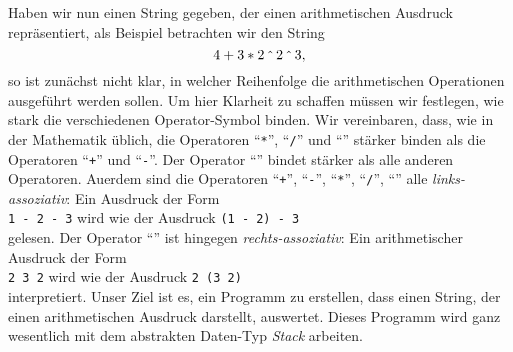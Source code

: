 Haben wir nun einen String gegeben, der einen arithmetischen Ausdruck repr\"asentiert, als
Beispiel betrachten wir den String
\[ 4 + 3 * 2 \mathop{\mathtt{\symbol{94}}} 2 \mathop{\mathtt{\symbol{94}}} 3, \]
so ist zun\"achst nicht klar, in welcher Reihenfolge die arithmetischen Operationen
ausgef\"uhrt werden sollen.   Um hier Klarheit zu schaffen m\"ussen wir festlegen, wie stark die
verschiedenen Operator-Symbol binden. Wir
vereinbaren, dass, wie in der Mathematik \"ublich, die Operatoren ``\texttt{*}'',
``\texttt{/}'' und ``\texttt{}'' st\"arker binden als die
Operatoren ``\texttt{+}'' und ``\texttt{-}''.  Der Operator ``\texttt{}''
bindet st\"arker als alle anderen Operatoren.
Au\3erdem sind die Operatoren ``\texttt{+}'', ``\texttt{-}'', ``\texttt{*}'',
``\texttt{/}'', ``\texttt{}'' alle \emph{links-assoziativ}:  Ein Ausdruck der
Form \\[0.1cm]
\hspace*{1.3cm} \texttt{1 - 2 - 3} \quad wird  wie der Ausdruck \quad \texttt{(1 - 2) - 3} \\[0.1cm]
gelesen.  Der Operator ``\texttt{}'' ist hingegen \emph{rechts-assoziativ}: Ein
arithmetischer Ausdruck der Form \\[0.1cm]
\hspace*{1.3cm} \texttt{2  3  2} \quad wird  wie der Ausdruck \quad 
\texttt{2  (3  2)} \\[0.1cm]
interpretiert.  Unser Ziel ist es, ein Programm zu erstellen, dass einen String, der
einen arithmetischen Ausdruck darstellt, auswertet.  Dieses Programm wird ganz wesentlich
mit dem abstrakten Daten-Typ \textsl{Stack} arbeiten.

